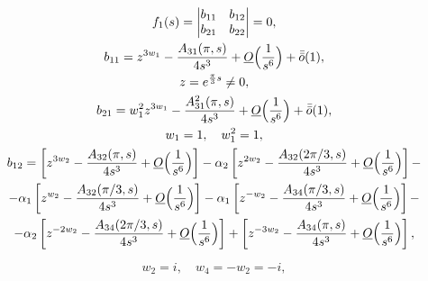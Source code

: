\begin{gather*}

f_1(s)=

\begin{vmatrix}

b_{11} &b_{12}\\

b_{21} &b_{22}

\end{vmatrix}

=0,\\

b_{11}=z^{3w_1}-\frac{A_{31}(\pi,s)}{4s^3} +\underline O\Bigl(\frac1{s^6}\Bigr)+\bar{\bar o}(1),\\

z=e^{\frac\pi3s}\ne0, \\

b_{21}=w^2_1 z^{3w_1}-\frac{A^2_{31}(\pi,s)}{4s^3} +\underline O\Bigl(\frac1{s^6}\Bigr)+\bar{\bar o}(1), \\

w_1=1, \quad w^2_1=1, \\

b_{12}=\left[z^{3w_2}-\frac{A_{32}(\pi,s)}{4s^3} +\underline O\Bigl(\frac1{s^6}\Bigr)\right]-

\alpha_2\left[z^{2w_2}-\frac{A_{32}({2\pi}/3,s)}{4s^3} +\underline O\Bigl(\frac1{s^6}\Bigr)\right]- \\-

\alpha_1\left[z^{w_2}-\frac{A_{32}({\pi}/3,s)}{4s^3} +\underline O\Bigl(\frac1{s^6}\Bigr)\right]-

\alpha_1\left[z^{-w_2}-\frac{A_{34}({\pi}/3,s)}{4s^3} +\underline O\Bigl(\frac1{s^6}\Bigr)\right]- \\-

\alpha_2\left[z^{-2w_2}-\frac{A_{34}({2\pi}/3,s)}{4s^3} +\underline O\Bigl(\frac1{s^6}\Bigr)\right]+

\left[z^{-3w_2}-\frac{A_{34}({\pi},s)}{4s^3} +\underline O\Bigl(\frac1{s^6}\Bigr)\right],

\end{gather*}

\begin{equation}

\label{mitr:eq29}

w_2=i, \quad w_4=-w_2=-i, 

\end{equation}

